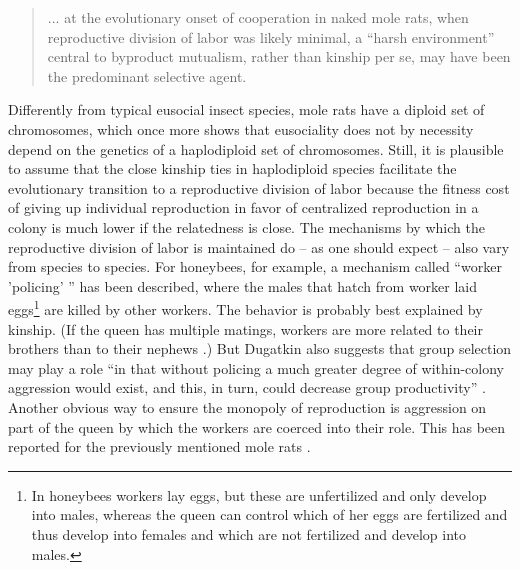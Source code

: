 \begin{quotation}
  ... at the evolutionary onset of cooperation in naked mole rats, when
  reproductive division of labor was likely minimal, a ``harsh environment''
  central to byproduct mutualism, rather than kinship per se, may have been
  the predominant selective agent. \cite[p.\ 106]{dugatkin:1997}
\end{quotation}

Differently from typical eusocial insect species, mole rats have a diploid set of
chromosomes, which once more shows that eusociality does not by necessity
depend on the genetics of a haplodiploid set of chromosomes. Still, it is
plausible to assume that the close kinship ties in haplodiploid species
facilitate the evolutionary transition to a reproductive division of labor
because the fitness cost of giving up individual reproduction in favor of
centralized reproduction in a colony is much lower if the relatedness is
close. The mechanisms by which the reproductive division of labor is
maintained do -- as one should expect -- also vary from species to species.
For honeybees, for example, a mechanism called ``worker 'policing' '' has been
described, where the males that hatch from worker laid eggs\footnote{In
  honeybees workers lay eggs, but these are unfertilized and only develop into
  males, whereas the queen can control which of her eggs are fertilized and
  thus develop into females and which are not fertilized and develop into
  males.} are killed by other workers. The behavior is probably best
explained by kinship. (If the queen has multiple matings, workers are more
related to their brothers than to their nephews \cite[p.\ 
150]{dugatkin:1997}.) But Dugatkin also suggests that group selection may play
a role ``in that without policing a much greater degree of within-colony
aggression would exist, and this, in turn, could decrease group productivity''
\cite[p.\ 151]{dugatkin:1997}. Another obvious way to ensure the monopoly of
reproduction is aggression on part of the queen by which the workers are
coerced into their role. This has been reported for the previously mentioned
mole rats \cite[p.\ 106]{dugatkin:1997}.

